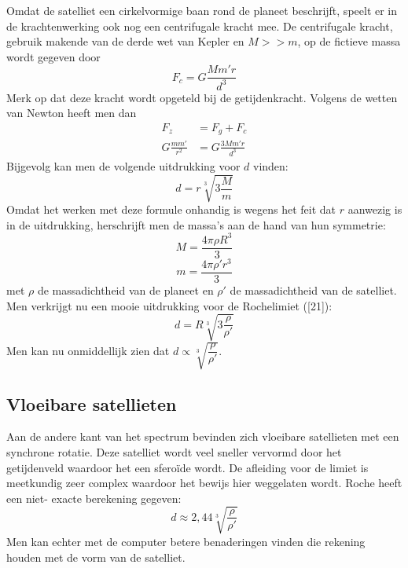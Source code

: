\documentclass[a4paper]{article}
\begin{document}
\noindent
Omdat de satelliet een cirkelvormige baan rond de planeet beschrijft, speelt er in de krachtenwerking ook nog een centrifugale kracht mee. De centrifugale kracht, gebruik makende van de derde wet van Kepler en $M>>m$, op de fictieve massa wordt gegeven door
	\begin{equation}
	F_c = G\frac{Mm'r}{d^3}
	\end{equation}
Merk op dat deze kracht wordt opgeteld bij de getijdenkracht. Volgens de wetten van Newton heeft men dan
\begin{align}
F_z &= F_g + F_c\\
G\frac{mm'}{r^2} &= G\frac{3Mm'r}{d^3}
\end{align}
Bijgevolg kan men de volgende uitdrukking voor $d$ vinden:
\begin{equation}
d = r\sqrt[3]{3\frac{M}{m}}
\end{equation}
Omdat het werken met deze formule onhandig is wegens het feit dat $r$ aanwezig is in de uitdrukking, herschrijft men de massa's aan de hand van hun symmetrie:
\begin{equation}
M = \frac{4\pi \rho R^3}{3}
\end{equation}
\begin{equation}
m = \frac{4\pi\rho' r^3}{3}
\end{equation}
met $\rho$ de massadichtheid van de planeet en $\rho'$ de massadichtheid van de satelliet. Men verkrijgt nu een mooie uitdrukking voor de Rochelimiet ([21]):
\begin{equation}
d = R\sqrt[3]{3\frac{\rho}{\rho'}}
\end{equation}
Men kan nu onmiddellijk zien dat $d \propto \sqrt[3]{\dfrac{\rho}{\rho'}}$.

\subsection{Vloeibare satellieten}
Aan de andere kant van het spectrum bevinden zich vloeibare satellieten met een synchrone rotatie. Deze satelliet wordt veel sneller vervormd door het getijdenveld waardoor het een sfero\"{i}de wordt. De afleiding voor de limiet is meetkundig zeer complex waardoor het bewijs hier weggelaten wordt. Roche heeft een niet- exacte berekening gegeven:
\begin{equation}
d \approx 2,44\sqrt[3]{\frac{\rho}{\rho'}}
\end{equation}
Men kan echter met de computer betere benaderingen vinden die rekening houden met de vorm van de satelliet.
\end{document}
